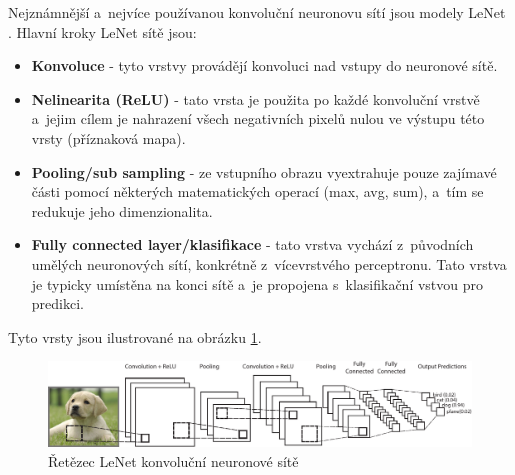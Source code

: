 Nejznámnější a~nejvíce používanou konvoluční neuronovu sítí jsou modely LeNet \cite{lenet}.
Hlavní kroky LeNet sítě jsou:
\begin{itemize}
  \item{\textbf{Konvoluce} - tyto vrstvy provádějí konvoluci nad vstupy do neuronové sítě.}
  \item{\textbf{Nelinearita (ReLU)} - tato vrsta je použita po každé konvoluční vrstvě a~jejim cílem je nahrazení všech negativních pixelů nulou ve výstupu této vrsty (příznaková mapa).}
  \item{\textbf{Pooling/sub sampling} - ze vstupního obrazu vyextrahuje pouze zajímavé části pomocí některých matematických operací (max, avg, sum), a~tím se redukuje jeho dimenzionalita.}
  \item{\textbf{Fully connected layer/klasifikace} - tato vrstva vychází z~původních umělých neuronových sítí, konkrétně z~vícevrstvého perceptronu. Tato vrstva je typicky umístěna na konci sítě a~je propojena s~klasifikační vstvou pro predikci.}
\end{itemize}

Tyto vrsty jsou ilustrované na obrázku \ref{fig:cnn}.
\begin{figure}[H]
\centering
\includegraphics[width=1.1\linewidth]{figures/cnn.pdf}
\caption{Řetězec LeNet konvoluční neuronové sítě \cite{lenet}}
\label{fig:cnn}
\end{figure}